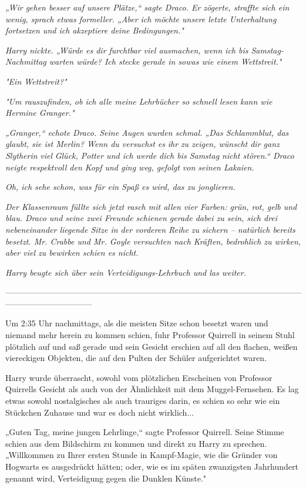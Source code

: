 {\emph{„Wir gehen besser auf unsere Plätze,“ sagte Draco. Er zögerte, straffte sich ein wenig, sprach etwas formeller. „Aber ich möchte unsere letzte Unterhaltung fortsetzen und ich akzeptiere deine Bedingungen."}

\emph{Harry nickte. „Würde es dir furchtbar viel ausmachen, wenn ich bis Samstag-Nachmittag warten würde? Ich stecke gerade in sowas wie einem Wettstreit."}

\emph{"Ein Wettstreit?"}

\emph{"Um rauszufinden, ob ich alle meine Lehrbücher so schnell lesen kann wie Hermine Granger."}

\emph{„Granger,“ echote Draco. Seine Augen wurden schmal. „Das Schlammblut, das glaubt, sie ist Merlin? Wenn du versuchst es} \emph{\emph{ihr}} \emph{zu zeigen, wünscht dir ganz Slytherin} \emph{\emph{viel}} \emph{Glück, Potter und ich werde dich bis Samstag nicht stören.“ Draco neigte respektvoll den Kopf und ging weg, gefolgt von seinen Lakaien.}

\emph{\emph{Oh, ich sehe schon, was für ein Spaß es wird, das zu jonglieren.}}

\emph{Der Klassenraum füllte sich jetzt rasch mit allen vier Farben: grün, rot, gelb und blau. Draco und seine zwei Freunde schienen gerade dabei zu sein, sich drei nebeneinander liegende Sitze in der vorderen Reihe zu} \emph{sichern -- natürlich bereits besetzt. Mr. Crabbe und Mr. Goyle versuchten nach Kräften, bedrohlich zu wirken, aber viel zu bewirken schien es nicht.}

\emph{Harry beugte sich über sein Verteidigungs-Lehrbuch und las weiter.}

--------------------------------------------------------------------------------------------------------------------------------------------

\hfill\break Um 2:35 Uhr nachmittags, als die meisten Sitze schon besetzt waren und niemand mehr herein zu kommen schien, fuhr Professor Quirrell in seinem Stuhl plötzlich auf und saß gerade und sein Gesicht erschien auf all den flachen, weißen viereckigen Objekten, die auf den Pulten der Schüler aufgerichtet waren.

Harry wurde überrascht, sowohl vom plötzlichen Erscheinen von Professor Quirrells Gesicht als auch von der Ähnlichkeit mit dem Muggel-Fernsehen. Es lag etwas sowohl nostalgisches als auch trauriges darin, es schien so sehr wie ein Stückchen Zuhause und war es doch nicht wirklich...

„Guten Tag, meine jungen Lehrlinge,“ sagte Professor Quirrell. Seine Stimme schien aus dem Bildschirm zu kommen und direkt zu Harry zu sprechen. „Willkommen zu Ihrer ersten Stunde in Kampf-Magie, wie die Gründer von Hogwarts es ausgedrückt hätten; oder, wie es im späten zwanzigsten Jahrhundert genannt wird, Verteidigung gegen die Dunklen Künste."

}
